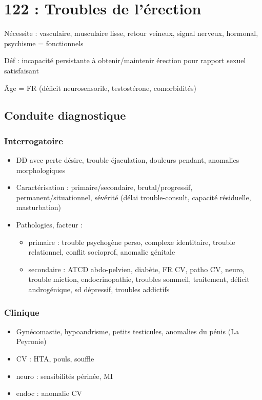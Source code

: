 \documentclass[11pt]{article}
\begin{document}
\section{122 : Troubles de l'érection}
\label{sec:org2feb435}
Nécessite : vasculaire, musculaire lisse, retour veineux, signal  nerveux,
hormonal, psychisme = fonctionnels

Déf : incapacité persistante à obtenir/maintenir érection pour rapport sexuel satisfaisant

Âge = FR (déficit neurosensorile, \inc testostérone, comorbidités)

\subsection{Conduite  diagnostique}
\label{sec:orgad8ac95}
\subsubsection{Interrogatoire}
\label{sec:org51ab790}
\begin{itemize}
\item DD avec perte désire, trouble éjaculation, douleurs pendant, anomalies morphologiques
\item Caractérisation : primaire/secondaire, brutal/progressif,
permanent/situationnel, sévérité (délai trouble-consult, capacité résiduelle,
masturbation)
\item Pathologies, facteur :
\begin{itemize}
\item primaire : trouble psychogène perso, complexe identitaire, trouble
relationnel, conflit socioprof, anomalie génitale
\item secondaire : ATCD abdo-pelvien, diabète, FR CV, patho CV, neuro, trouble
miction, endocrinopathie, troubles sommeil, traitement, déficit
androgénique, sd dépressif, troubles addictifs
\end{itemize}
\end{itemize}
\subsubsection{Clinique}
\label{sec:org6254146}
\begin{itemize}
\item Gynécomastie, hypoandrisme, petits testicules, anomalies du pénis (La Peyronie)
\item CV : HTA, pouls, souffle
\item neuro : sensibilités périnée, MI
\item endoc : anomalie CV
\end{itemize}
\end{document}
